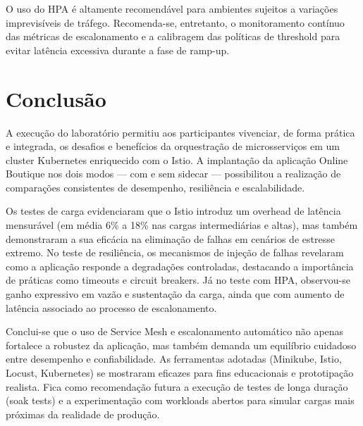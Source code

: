 \documentclass[12pt,a4paper]{report}
\begin{document}
O uso do HPA é altamente recomendável para ambientes sujeitos a variações imprevisíveis de tráfego. Recomenda-se, entretanto, o monitoramento contínuo das métricas de escalonamento e a calibragem das políticas de threshold para evitar latência excessiva durante a fase de ramp-up.




\section*{Conclusão}

A execução do laboratório permitiu aos participantes vivenciar, de forma prática e integrada, os desafios e benefícios da orquestração de microsserviços em um cluster Kubernetes enriquecido com o Istio. A implantação da aplicação Online Boutique nos dois modos — com e sem sidecar — possibilitou a realização de comparações consistentes de desempenho, resiliência e escalabilidade.

Os testes de carga evidenciaram que o Istio introduz um overhead de latência mensurável (em média 6\% a 18\% nas cargas intermediárias e altas), mas também demonstraram a sua eficácia na eliminação de falhas em cenários de estresse extremo. No teste de resiliência, os mecanismos de injeção de falhas revelaram como a aplicação responde a degradações controladas, destacando a importância de práticas como timeouts e circuit breakers. Já no teste com HPA, observou-se ganho expressivo em vazão e sustentação da carga, ainda que com aumento de latência associado ao processo de escalonamento.

Conclui-se que o uso de Service Mesh e escalonamento automático não apenas fortalece a robustez da aplicação, mas também demanda um equilíbrio cuidadoso entre desempenho e confiabilidade. As ferramentas adotadas (Minikube, Istio, Locust, Kubernetes) se mostraram eficazes para fins educacionais e prototipação realista. Fica como recomendação futura a execução de testes de longa duração (soak tests) e a experimentação com workloads abertos para simular cargas mais próximas da realidade de produção.

%
\printbibliography[title={Referências}]
\end{document}
